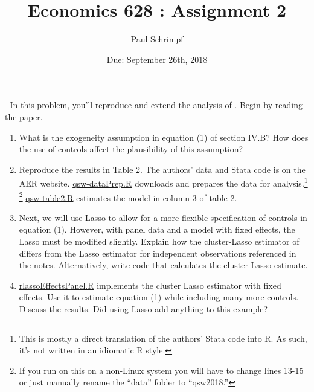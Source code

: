 

\title{Economics 628 : Assignment 2}
\author{Paul Schrimpf}
\date{Due: September 26th, 2018}


\maketitle


\begin{problem}$\;$
  In this problem, you'll reproduce and extend the analysis of
  \cite{qsw2018}. Begin by reading the paper.
  \begin{enumerate}
  \item What is the exogeneity assumption in equation (1) of section
    IV.B? How does the use of controls affect the plausibility of this
    assumption?
  \item Reproduce the results in Table 2. The authors' data and Stata
    code is on the AER website.
    \href{https://github.com/ubcecon/ECON628_2018/tree/master/paul/assignments/02/qsw-dataPrep.R}
    {qsw-dataPrep.R} 
    downloads and prepares the data for analysis.\footnote{This is
      mostly a direct translation of the authors' Stata code into
      R. As such, it's not written in an idiomatic R style.}
    \footnote{If you
      run on this on a non-Linux system you will have to change lines
      13-15 or just manually rename the ``data'' folder to ``qsw2018.''}
    \href{https://github.com/ubcecon/ECON628_2018/tree/master/paul/assignments/02/qsw-table2.R}
    {qsw-table2.R} estimates the model in column 3 of table 2.
  \item Next, we will use Lasso to allow for a more flexible
    specification of controls in equation (1). However, with panel
    data and a model with fixed effects, the Lasso must be modified
    slightly. Explain how the cluster-Lasso estimator of
    \cite{bchk2016} differs from the Lasso estimator for independent
    observations referenced in the notes. Alternatively, write code
    that calculates the cluster Lasso estimate. 
  \item
    \href{https://github.com/ubcecon/ECON628_2018/tree/master/paul/assignments/02/rlassoPanel.R}
    {rlassoEffectsPanel.R}
    implements the cluster Lasso estimator with fixed effects. Use it
    to estimate equation (1) while including many 
    more controls. Discuss the results. Did using Lasso add anything
    to this example?
  \end{enumerate}
\end{problem}







